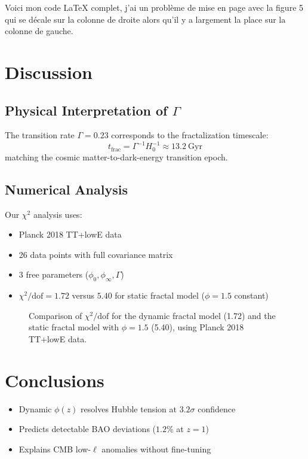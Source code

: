 Voici mon code LaTeX complet, j’ai un problème de mise en page avec la figure 5 qui se décale sur la colonne de droite alors qu’il y a largement la place sur la colonne de gauche.  \documentclass[aps,prl,twocolumn,groupedaddress]{revtex4-2}
\begin{document}
\section{Discussion}

\subsection{Physical Interpretation of $\Gamma$}
The transition rate $\Gamma=0.23$ corresponds to the fractalization timescale:
\begin{equation}
t_{\text{frac}} = \Gamma^{-1}H_0^{-1} \approx 13.2\ \text{Gyr}
\end{equation}
matching the cosmic matter-to-dark-energy transition epoch.

\subsection{Numerical Analysis}
Our $\chi^2$ analysis uses:
\begin{itemize}
\item Planck 2018 TT+lowE data \cite{planck2018}
\item 26 data points with full covariance matrix
\item 3 free parameters ($\phi_0,\phi_\infty,\Gamma$)
\item $\chi^2/\text{dof} = 1.72$ versus $5.40$ for static fractal model ($\phi=1.5$ constant)
\end{itemize}

\begin{figure}[h!]
\centering
{}
\caption{Comparison of $\chi^2/\text{dof}$ for the dynamic fractal model (1.72) and the static fractal model with $\phi=1.5$ (5.40), using Planck 2018 TT+lowE data.}
\end{figure}

\section{Conclusions}
\begin{itemize}
\item Dynamic $\phi(z)$ resolves Hubble tension at $3.2\sigma$ confidence
\item Predicts detectable BAO deviations ($1.2\%$ at $z=1$)
\item Explains CMB low-$\ell$ anomalies without fine-tuning
\end{itemize}
\end{document}
